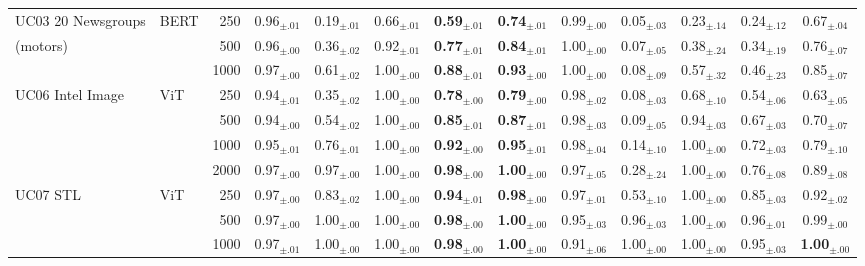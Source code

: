 \begin{table}[htbp!]
{\begin{tabular}{llr|ccccc|ccccc}
\addlinespace
UC03 20 Newsgroups & BERT & 250 & 0.96$_{\pm.01}$ & 0.19$_{\pm.01}$ & 0.66$_{\pm.01}$ & \textbf{0.59}$_{\pm.01}$ & \textbf{0.74}$_{\pm.01}$ & 0.99$_{\pm.00}$ & 0.05$_{\pm.03}$ & 0.23$_{\pm.14}$ & 0.24$_{\pm.12}$ & 0.67$_{\pm.04}$ \\
\hspace{1em}(motors) &  & 500 & 0.96$_{\pm.00}$ & 0.36$_{\pm.02}$ & 0.92$_{\pm.01}$ & \textbf{0.77}$_{\pm.01}$ & \textbf{0.84}$_{\pm.01}$ & 1.00$_{\pm.00}$ & 0.07$_{\pm.05}$ & 0.38$_{\pm.24}$ & 0.34$_{\pm.19}$ & 0.76$_{\pm.07}$ \\
 &  & 1000 & 0.97$_{\pm.00}$ & 0.61$_{\pm.02}$ & 1.00$_{\pm.00}$ & \textbf{0.88}$_{\pm.01}$ & \textbf{0.93}$_{\pm.00}$ & 1.00$_{\pm.00}$ & 0.08$_{\pm.09}$ & 0.57$_{\pm.32}$ & 0.46$_{\pm.23}$ & 0.85$_{\pm.07}$ \\
\addlinespace
UC06 Intel Image & ViT & 250 & 0.94$_{\pm.01}$ & 0.35$_{\pm.02}$ & 1.00$_{\pm.00}$ & \textbf{0.78}$_{\pm.00}$ & \textbf{0.79}$_{\pm.00}$ & 0.98$_{\pm.02}$ & 0.08$_{\pm.03}$ & 0.68$_{\pm.10}$ & 0.54$_{\pm.06}$ & 0.63$_{\pm.05}$ \\
 &  & 500 & 0.94$_{\pm.00}$ & 0.54$_{\pm.02}$ & 1.00$_{\pm.00}$ & \textbf{0.85}$_{\pm.01}$ & \textbf{0.87}$_{\pm.01}$ & 0.98$_{\pm.03}$ & 0.09$_{\pm.05}$ & 0.94$_{\pm.03}$ & 0.67$_{\pm.03}$ & 0.70$_{\pm.07}$ \\
 &  & 1000 & 0.95$_{\pm.01}$ & 0.76$_{\pm.01}$ & 1.00$_{\pm.00}$ & \textbf{0.92}$_{\pm.00}$ & \textbf{0.95}$_{\pm.01}$ & 0.98$_{\pm.04}$ & 0.14$_{\pm.10}$ & 1.00$_{\pm.00}$ & 0.72$_{\pm.03}$ & 0.79$_{\pm.10}$ \\
 &  & 2000 & 0.97$_{\pm.00}$ & 0.97$_{\pm.00}$ & 1.00$_{\pm.00}$ & \textbf{0.98}$_{\pm.00}$ & \textbf{1.00}$_{\pm.00}$ & 0.97$_{\pm.05}$ & 0.28$_{\pm.24}$ & 1.00$_{\pm.00}$ & 0.76$_{\pm.08}$ & 0.89$_{\pm.08}$ \\
\addlinespace
UC07 STL & ViT & 250 & 0.97$_{\pm.00}$ & 0.83$_{\pm.02}$ & 1.00$_{\pm.00}$ & \textbf{0.94}$_{\pm.01}$ & \textbf{0.98}$_{\pm.00}$ & 0.97$_{\pm.01}$ & 0.53$_{\pm.10}$ & 1.00$_{\pm.00}$ & 0.85$_{\pm.03}$ & 0.92$_{\pm.02}$ \\
 &  & 500 & 0.97$_{\pm.00}$ & 1.00$_{\pm.00}$ & 1.00$_{\pm.00}$ & \textbf{0.98}$_{\pm.00}$ & \textbf{1.00}$_{\pm.00}$ & 0.95$_{\pm.03}$ & 0.96$_{\pm.03}$ & 1.00$_{\pm.00}$ & 0.96$_{\pm.01}$ & 0.99$_{\pm.00}$ \\
 &  & 1000 & 0.97$_{\pm.01}$ & 1.00$_{\pm.00}$ & 1.00$_{\pm.00}$ & \textbf{0.98}$_{\pm.00}$ & \textbf{1.00}$_{\pm.00}$ & 0.91$_{\pm.06}$ & 1.00$_{\pm.00}$ & 1.00$_{\pm.00}$ & 0.95$_{\pm.03}$ & \textbf{1.00}$_{\pm.00}$ \\

\end{tabular}}
\end{table}
